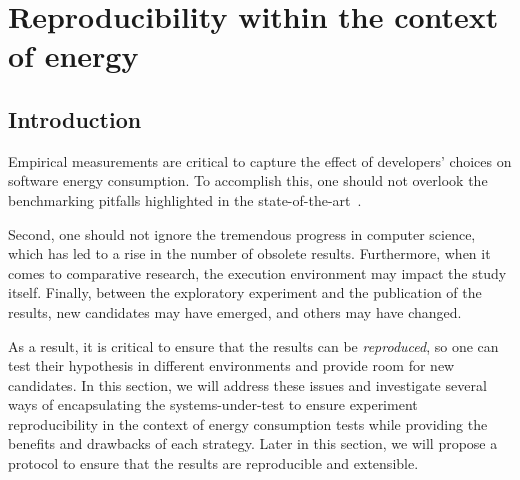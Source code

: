 \section{Reproducibility within the context of energy}\label{sec:benchmarking_reproducibility}
\subsection{Introduction}

Empirical measurements are critical to capture the effect of developers' choices on software energy consumption.
To accomplish this, one should not overlook the benchmarking pitfalls highlighted in the state-of-the-art~\cite {van_der_kouwe_benchmarking_2018}.

Second, one should not ignore the tremendous progress in computer science, which has led to a rise in the number of obsolete results.
Furthermore, when it comes to comparative research, the execution environment may impact the study itself.
Finally, between the exploratory experiment and the publication of the results, new candidates may have emerged, and others may have changed.

As a result, it is critical to ensure that the results can be \emph{reproduced}, so one can test their hypothesis in different environments and provide room for new candidates.
In this section, we will address these issues and investigate several ways of encapsulating the systems-under-test to ensure experiment reproducibility in the context of energy consumption tests while providing the benefits and drawbacks of each strategy.
Later in this section, we will propose a protocol to ensure that the results are reproducible and extensible.








